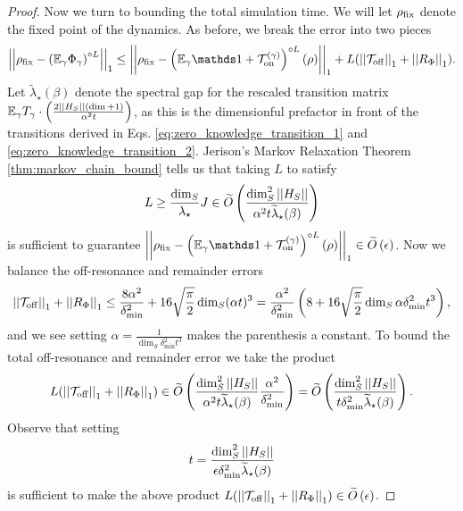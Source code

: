 \begin{proof}
    Now we turn to bounding the total simulation time. We will let $\rho_{\rm fix}$ denote the fixed point of the dynamics. As before, we break the error into two pieces
    \begin{equation}
        \norm{\rho_{\rm fix} - \left(\EE_\gamma \Phi_\gamma \right)^{\circ L}}_1 \le \norm{\rho_{\rm fix} - \left(\EE_\gamma \identity + \TT_{\on}^{(\gamma)}\right)^{\circ L} (\rho)}_1 + L(\norm{\TT_{\off}}_1 + \norm{R_{\Phi}}_1).
    \end{equation}
    Let $\widetilde{\lambda}_\star(\beta)$ denote the spectral gap for the rescaled transition matrix $\mathbb{E}_\gamma T_\gamma \cdot \left(\frac{2 \left| \left| H_S \right| \right| (\dim + 1)}{\alpha^2 t}\right)$, as this is the dimensionful prefactor in front of the transitions derived in Eqs. \eqref{eq:zero_knowledge_transition_1} and \eqref{eq:zero_knowledge_transition_2}. Jerison's Markov Relaxation Theorem \ref{thm:markov_chain_bound} tells us that taking $L$ to satisfy
    \begin{equation}
        L \ge \frac{\dim_S}{\lambda_\star} J \in \widetilde{O} \left( \frac{\dim_S^2 \left| \left| H_S \right| \right|}{\alpha^2 t \widetilde{\lambda}_\star(\beta)} \right)\label{eq:Lbd}
    \end{equation}
    is sufficient to guarantee $\norm{\rho_{\rm fix} - \left(\EE_\gamma \identity + \TT_{\on}^{(\gamma)}\right)^{\circ L} (\rho)}_1 \in \bigotilde{\epsilon}$. Now we balance the off-resonance and remainder errors
    \begin{equation}
        \left| \left| \mathcal{T}_{\rm off} \right| \right|_1 + \left| \left| R_{\Phi} \right| \right|_1 \le \frac{8 \alpha^2}{\delta_{\min}^2} + 16 \sqrt{\frac{\pi}{2}} \dim_S (\alpha t)^3 = \frac{\alpha^2}{\delta_{\min}^2} \left( 8 + 16 \sqrt{\frac{\pi}{2}} \dim_S \alpha \delta_{\min}^2 t^3 \right),
    \end{equation}
    and we see setting $\alpha = \frac{1}{\dim_S \delta_{\min}^2 t^3}$ makes the parenthesis a constant.
    To bound the total off-resonance and remainder error we take the product
    \begin{equation}
        L(\left| \left| \mathcal{T}_{\rm off} \right| \right|_1 + \left| \left| R_{\Phi} \right| \right|_1) \in \widetilde{O} \left( \frac{\dim_S^2 \left| \left| H_S \right| \right|}{\alpha^2 t \widetilde{\lambda}_\star(\beta)} \frac{\alpha^2}{\delta_{\min}^2} \right) = \widetilde{O} \left( \frac{\dim_S^2 \left| \left| H_S \right| \right|}{ t \delta_{\min}^2 \widetilde{\lambda}_\star(\beta)}  \right).
    \end{equation}
    Observe that setting 
    \begin{equation}
        t = \frac{\dim_S^2 \left| \left| H_S \right| \right|}{\epsilon \delta_{\min}^2 \widetilde{\lambda}_\star(\beta)}
    \end{equation} 
    is sufficient to make the above product $L(\left| \left| \mathcal{T}_{\rm off} \right| \right|_1 + \left| \left| R_{\Phi} \right| \right|_1) \in\widetilde{O} \left( \epsilon \right)$. 


\end{proof}
